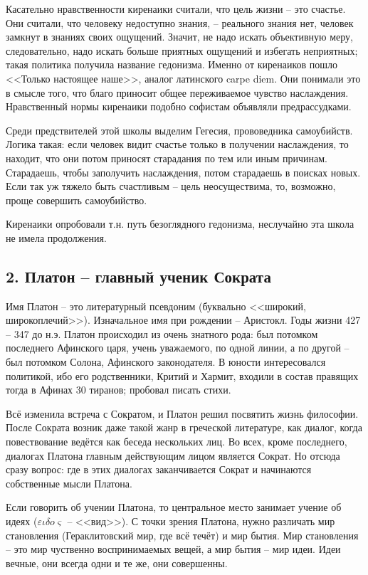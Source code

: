 \documentclass[a4paper, 12pt]{article} %
\begin{document}
Касательно нравственности киренаики считали, что цель жизни -- это счастье. Они считали, что человеку недоступно знания, -- реального знания нет, человек замкнут в знаниях своих ощущений. Значит, не надо искать объективную меру, следовательно, надо искать больше приятных ощущений и избегать неприятных; такая политика получила название гедонизма. Именно от киренаиков пошло <<Только настоящее наше>>, аналог латинского carpe diem. Они понимали это в смысле того, что благо приносит общее переживаемое чувство наслаждения. Нравственный нормы киренаики подобно софистам объявляли предрассудками.

Среди предствителей этой школы выделим Гегесия, прововедника самоубийств. Логика такая: если человек видит счастье только в получении наслаждения, то находит, что они потом приносят старадания по тем или иным причинам. Старадаешь, чтобы заполучить наслаждения, потом старадаешь в поисках новых. Если так уж тяжело быть счастливым -- цель неосуществима, то, возможно, проще совершить самоубийство.

Киренаики опробовали т.н. путь безоглядного гедонизма, неслучайно эта школа не имела продолжения.

\subsection*{2. Платон -- главный ученик Сократа}

Имя Платон -- это литературный псевдоним (буквально <<широкий, широкоплечий>>). Изначальное имя при рождении -- Аристокл. Годы жизни 427 -- 347 до н.э. Платон происходил из очень знатного рода: был потомком последнего Афинского царя, учень уважаемого, по одной линии, а по другой -- был потомком Солона, Афинского законодателя. В юности интересовался политикой, ибо его родственники, Критий и Хармит, входили в состав правящих тогда в Афинах 30 тиранов; пробовал писать стихи.

Всё изменила встреча с Сократом, и Платон решил посвятить жизнь философии. После Сократа возник даже такой жанр в греческой литературе, как диалог, когда повествование ведётся как беседа нескольких лиц. Во всех, кроме последнего, диалогах Платона главным действующим лицом является Сократ. Но отсюда сразу вопрос: где в этих диалогах заканчивается Сократ и начинаются собственные мысли Платона. 

Если говорить об учении Платона, то центральное место занимает учение об идеях ($\varepsilon \iota \delta o \varsigma$  -- <<вид>>). С точки зрения Платона, нужно различать мир становления (Гераклитовский мир, где всё течёт) и мир бытия. Мир становления -- это мир чуственно воспринимаемых вещей, а мир бытия -- мир идеи. Идеи вечные, они всегда одни и те же, они совершенны. 
\end{document}
